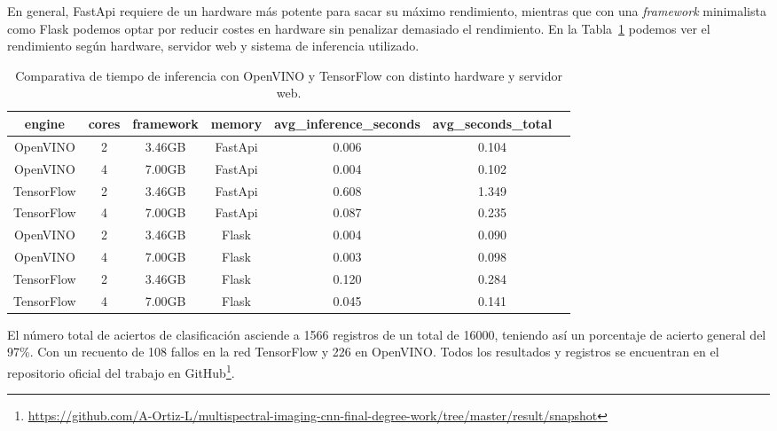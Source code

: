 En general, FastApi requiere de un hardware más potente para sacar su máximo rendimiento, mientras que con una \textit{framework} minimalista como Flask podemos optar por reducir costes en hardware sin penalizar demasiado el rendimiento.
En la Tabla~\ref{tab:Comparativa de tiempo de inferencia con OpenVINO y TensorFlow con distinto hardware y servidor web} podemos ver el rendimiento según hardware, servidor web y sistema de inferencia utilizado.

\begin{table}[ht]
    \begin{center}
        \small
        \begin{tabular}{ | c | c | c | c| c | c | c |}
            \hline
            engine & cores & framework & memory & avg\_inference\_seconds & avg\_seconds\_total \\ \hline
            OpenVINO & 2 & 3.46GB & FastApi & 0.006 & 0.104 \\
            OpenVINO & 4 & 7.00GB & FastApi & 0.004 & 0.102 \\
            TensorFlow & 2 & 3.46GB & FastApi & 0.608 & 1.349 \\
            TensorFlow & 4 & 7.00GB & FastApi & 0.087 & 0.235 \\
            OpenVINO & 2 & 3.46GB & Flask & 0.004 & 0.090 \\
            OpenVINO & 4 & 7.00GB & Flask & 0.003 & 0.098 \\
            TensorFlow & 2 & 3.46GB & Flask & 0.120 & 0.284 \\
            TensorFlow & 4 & 7.00GB & Flask & 0.045 & 0.141 \\ \hline
        \end{tabular}
    \end{center}
    \caption{Comparativa de tiempo de inferencia con OpenVINO y TensorFlow con distinto hardware y servidor web.}
    \label{tab:Comparativa de tiempo de inferencia con OpenVINO y TensorFlow con distinto hardware y servidor web}
\end{table}


El número total de aciertos de clasificación asciende a 1566 registros de un total de 16000, teniendo así un porcentaje de acierto general
del 97\%. Con un recuento de 108 fallos en la red TensorFlow y 226 en OpenVINO.
Todos los resultados y registros se encuentran en el repositorio oficial del trabajo en GitHub\footnote{\url{https://github.com/A-Ortiz-L/multispectral-imaging-cnn-final-degree-work/tree/master/result/snapshot}}.


